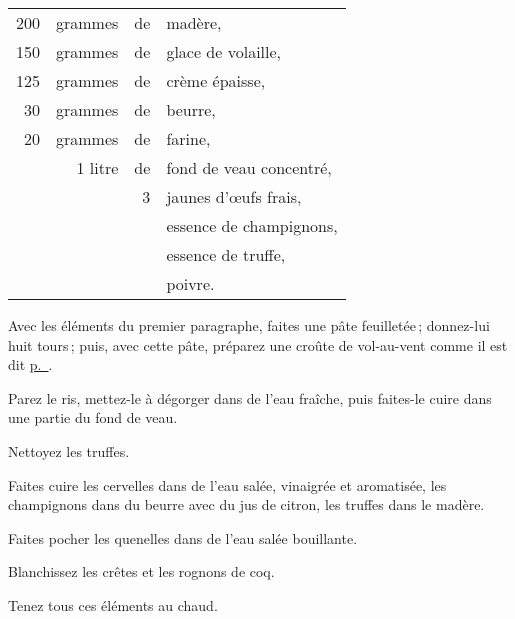 \footnotesize
\begin{longtable}{rrrp{16em}}
    200 & grammes & de & madère,                                                                          \\
    150 & grammes & de & glace de volaille,                                                               \\
    125 & grammes & de & crème épaisse,                                                                   \\
     30 & grammes & de & beurre,                                                                          \\
     20 & grammes & de & farine,                                                                          \\
        & 1 litre & de & fond de veau concentré,                                                          \\
        &         &  3 & jaunes d'œufs frais,                                                             \\
        &         &    & essence de champignons,                                                          \\
        &         &    & essence de truffe,                                                               \\
        &         &    & poivre.                                                                          \\
\end{longtable}
\normalsize

Avec les éléments du premier paragraphe, faites une pâte feuilletée ;
donnez-lui huit tours ; puis, avec cette pâte, préparez une croûte de
vol-au-vent comme il est dit \hyperlink{p0319}{p. \pageref{pg0319}}.

Parez le ris, mettez-le à dégorger dans de l'eau fraîche, puis faites-le cuire
dans une partie du fond de veau.

Nettoyez les truffes.

Faites cuire les cervelles dans de l'eau salée, vinaigrée et aromatisée, les
champignons dans du beurre avec du jus de citron, les truffes dans le madère.

Faites pocher les quenelles dans de l’eau salée bouillante.

Blanchissez les crêtes et les rognons de coq.

Tenez tous ces éléments au chaud.

